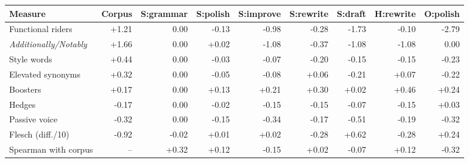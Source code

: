 \begin{tabular}{l r rrrrrrr}
\toprule
Measure & Corpus & S:grammar & S:polish & S:improve & S:rewrite & S:draft & H:rewrite & O:polish \\
\midrule
Functional riders & +1.21 & 0.00 & -0.13 & -0.98 & -0.28 & -1.73 & -0.10 & -2.79 \\
\textit{Additionally/Notably} & +1.66 & 0.00 & +0.02 & -1.08 & -0.37 & -1.08 & -1.08 & 0.00 \\
Style words & +0.44 & 0.00 & -0.03 & -0.07 & -0.20 & -0.15 & -0.15 & -0.23 \\
Elevated synonyms & +0.32 & 0.00 & -0.05 & -0.08 & +0.06 & -0.21 & +0.07 & -0.22 \\
Boosters & +0.17 & 0.00 & +0.13 & +0.21 & +0.30 & +0.02 & +0.46 & +0.24 \\
Hedges & -0.17 & 0.00 & -0.02 & -0.15 & -0.15 & -0.07 & -0.15 & +0.03 \\
Passive voice & -0.32 & 0.00 & -0.15 & -0.34 & -0.17 & -0.51 & -0.19 & -0.32 \\
Flesch (diff./10) & -0.92 & -0.02 & +0.01 & +0.02 & -0.28 & +0.62 & -0.28 & +0.24 \\
\midrule
Spearman with corpus & -- & +0.32 & +0.12 & -0.15 & +0.02 & -0.07 & +0.12 & -0.32 \\
\bottomrule
\end{tabular}
